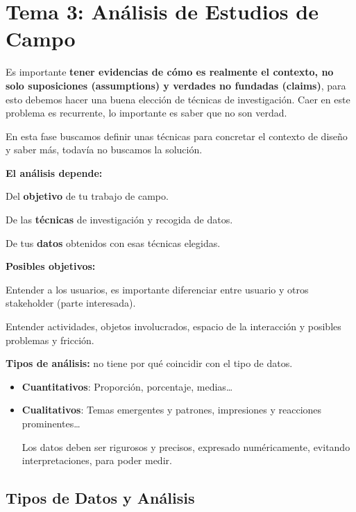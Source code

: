 \documentclass[12pt]{report} %
\begin{document}
\chapter{Tema 3: Análisis de Estudios de
Campo}

Es importante \textbf{tener evidencias de cómo es realmente el contexto,
no solo suposiciones (assumptions) y verdades no fundadas (claims)},
para esto debemos hacer una buena elección de técnicas de investigación.
Caer en este problema es recurrente, lo importante es saber que no son
verdad.

En esta fase buscamos definir unas técnicas para concretar el contexto
de diseño y saber más, todavía no buscamos la solución.

\textbf{El análisis depende:}

Del \textbf{objetivo} de tu trabajo de campo.

De las \textbf{técnicas} de investigación y recogida de datos.

De tus \textbf{datos} obtenidos con esas técnicas elegidas.

\textbf{Posibles objetivos:}

Entender a los usuarios, es importante diferenciar entre usuario y otros
stakeholder (parte interesada).

Entender actividades, objetos involucrados, espacio de la interacción y
posibles problemas y fricción.

\textbf{Tipos de análisis:} no tiene por qué coincidir con el tipo de
datos.

\begin{itemize}
\item
  \textbf{Cuantitativos}: Proporción, porcentaje, medias\ldots{}
\item
  \textbf{Cualitativos}: Temas emergentes y patrones, impresiones y
  reacciones prominentes\ldots{}

  Los datos deben ser rigurosos y precisos, expresado numéricamente,
  evitando interpretaciones, para poder medir.
\end{itemize}

\section{Tipos de Datos y
Análisis}
\end{document}
